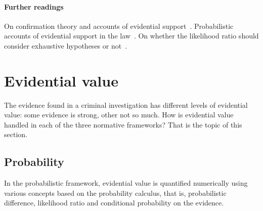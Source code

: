 \documentclass[10pt]{article}
\begin{document}
\paragraph{Further readings} 
On confirmation theory and accounts of 
evidential support~\citep{carnap1950, fitelson1999, skyrms1999, hacking2001, bovensEtAl2003, crupi2015}.
Probabilistic accounts of evidential support in the law~\citep{lempert1977}.
On whether the likelihood ratio should consider 
exhaustive hypotheses or not~\citep{fentonEtAl2014, biedermanEtAl2014}.


\section{Evidential value}
\label{sec:str}

The evidence found in a criminal investigation has different levels of evidential value: some evidence is  strong, other not so much. How is evidential value handled in each of the three normative frameworks? That is the topic of this section.

\subsection{Probability}

In the probabilistic framework, evidential value is quantified numerically using various 
concepts based 
on the probability calculus, that is, 
probabilistic difference, likelihood ratio and conditional probability on the evidence.
	
\end{document}
